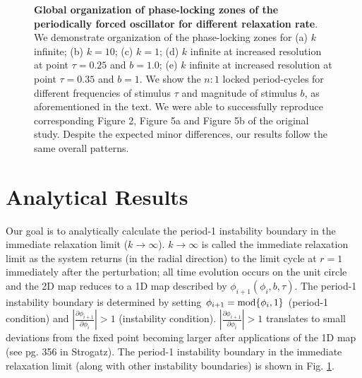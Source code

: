 \begin{figure}[tbph]
    \hfil
    
\caption{\textbf{Global organization of phase-locking zones of the periodically forced oscillator for different relaxation rate}. We demonstrate organization of the phase-locking zones for (a) $k$ infinite; (b) $k = 10$; (c) $k = 1$; (d) $k$ infinite at increased resolution at point $\tau = 0.25$ and $b = 1.0$; (e) $k$ infinite at increased resolution at point $\tau = 0.35$ and $b = 1$. We show the $n:1$ locked period-cycles for different frequencies of stimulus $\tau$ and magnitude of stimulus $b$, as aforementioned in the text. We were able to successfully reproduce corresponding Figure 2, Figure 5a and Figure 5b of the original study. Despite the expected minor differences, our results follow the same overall patterns.}
    \label{replic}
\end{figure}


\section{Analytical Results}
\indent Our goal is to analytically calculate the period-1 instability boundary in the immediate relaxation limit ($k \rightarrow \infty$). $k \rightarrow \infty$ is called the immediate relaxation limit as the system returns (in the radial direction) to the limit cycle at $r=1$ immediately after the perturbation; all time evolution occurs on the unit circle and the 2D map reduces to a 1D map described by $\phi_{i+1}(\phi_i, b, \tau)$. The period-1 instability boundary is determined by setting $\phi_{i+1} = \textnormal{mod} \{\phi_i,1\}$ (period-1 condition) and $|\frac{\partial \phi_{i+1}}{\partial \phi_i}|>1$ (instability condition). $|\frac{\partial \phi_{i+1}}{\partial \phi_i}|>1$ translates to small deviations from the fixed point becoming larger after applications of the 1D map (see pg. 356 in Strogatz\supercite{Strogatz}). The period-1 instability boundary in the immediate relaxation limit (along with other instability boundaries) is shown in Fig. \ref{replic}.

